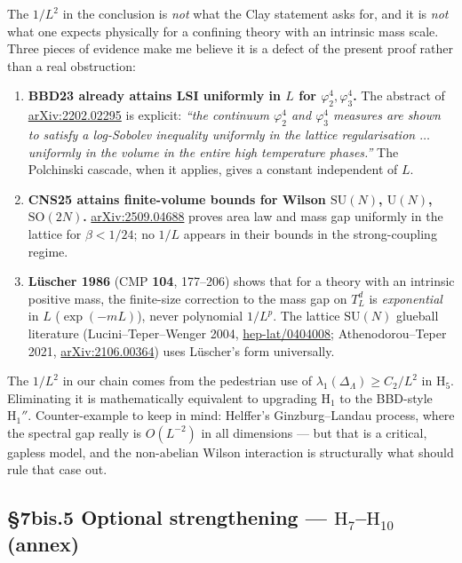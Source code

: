 \documentclass[11pt,a4paper]{article}
\newcommand{\SU}[1]{\mathrm{SU}(#1)}
\begin{document}
The $1/L^2$ in the conclusion is \emph{not} what the Clay statement asks for, and it is \emph{not} what one expects physically for a confining theory with an intrinsic mass scale. Three pieces of evidence make me believe it is a defect of the present proof rather than a real obstruction:
\begin{enumerate}
  \item \textbf{BBD23 already attains LSI uniformly in $L$ for $\varphi^4_2, \varphi^4_3$.} The abstract of \href{https://arxiv.org/abs/2202.02295}{arXiv:2202.02295} is explicit: \emph{``the continuum $\varphi^4_2$ and $\varphi^4_3$ measures are shown to satisfy a log-Sobolev inequality uniformly in the lattice regularisation $\ldots$ uniformly in the volume in the entire high temperature phases.''} The Polchinski cascade, when it applies, gives a constant independent of $L$.
  \item \textbf{CNS25 attains finite-volume bounds for Wilson $\SU{N}$, $\mathrm{U}(N)$, $\mathrm{SO}(2N)$.} \href{https://arxiv.org/abs/2509.04688}{arXiv:2509.04688} proves area law and mass gap uniformly in the lattice for $\beta < 1/24$; no $1/L$ appears in their bounds in the strong-coupling regime.
  \item \textbf{Lüscher 1986} (CMP \textbf{104}, 177--206) shows that for a theory with an intrinsic positive mass, the finite-size correction to the mass gap on $T^d_L$ is \emph{exponential} in $L$ ($\exp(-mL)$), never polynomial $1/L^p$. The lattice $\SU{N}$ glueball literature (Lucini--Teper--Wenger 2004, \href{https://arxiv.org/abs/hep-lat/0404008}{hep-lat/0404008}; Athenodorou--Teper 2021, \href{https://arxiv.org/abs/2106.00364}{arXiv:2106.00364}) uses Lüscher's form universally.
\end{enumerate}
The $1/L^2$ in our chain comes from the pedestrian use of $\lambda_1(\Delta_\Lambda) \ge C_2/L^2$ in $\mathrm{H}_5$. Eliminating it is mathematically equivalent to upgrading $\mathrm{H}_1$ to the BBD-style $\mathrm{H}_1''$. Counter-example to keep in mind: Helffer's Ginzburg--Landau process, where the spectral gap really is $O(L^{-2})$ in all dimensions --- but that is a critical, gapless model, and the non-abelian Wilson interaction is structurally what should rule that case out.

\subsection*{§7bis.5 Optional strengthening --- $\mathrm{H}_7$--$\mathrm{H}_{10}$ (annex)}
\end{document}
